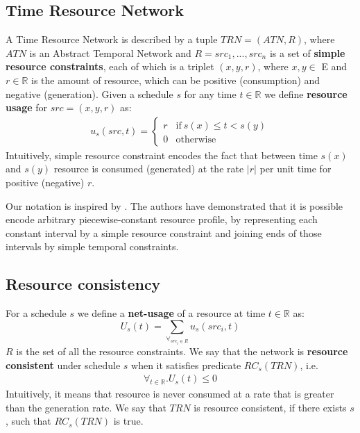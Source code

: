 \subsection{Time Resource Network}
\label{sec:trn_definition}
A Time Resource Network is described by a tuple $TRN = (ATN, R)$, where $ATN$ is an Abstract Temporal Network and $R={src_1, ..., src_n}$ is a set of \textbf{simple resource constraints}, each of which is a triplet $(x, y, r)$, where $x, y \in$ E and $r \in \mathbb{R}$ is the amount of resource, which can be positive (consumption) and negative (generation). Given a schedule $s$ for any time $t \in \mathbb{R}$ we define \textbf{resource usage} for $src=(x,y,r)$ as:
\begin{align*}
u_s(src, t) = \begin{cases}
r & \text{if}\ s(x) \leq t < s(y)\\
0 & \text{otherwise}
\end{cases}
\end{align*}
Intuitively, simple resource constraint encodes the fact that between time $s(x)$ and $s(y)$  resource is consumed (generated) at the rate $|r|$ per unit time for positive (negative) $r$.

Our notation is inspired by \cite{bartusch1988scheduling}. The authors have demonstrated that it is possible encode arbitrary piecewise-constant resource profile, by representing each constant interval by a simple resource constraint and joining ends of those intervals by simple temporal constraints.


\subsection{Resource consistency}
For a schedule $s$ we define a \textbf{net-usage} of a resource at time $t \in \mathbb{R}$ as:
\[
U_s(t) = \sum_{\forall_{src_i \in R}} u_s(src_i, t)
\]
$R$ is the set of all the resource constraints. We say that the network is \textbf{resource consistent} under schedule $s$ when it satisfies predicate $RC_s(TRN)$, i.e.
\begin{align}
\label{usage_for_all}\forall_{t \in \mathbb{R}} . U_s(t) \leq 0
\end{align}
Intuitively, it means that resource is never consumed at a rate that is greater than the generation rate. We say that $TRN$ is resource consistent, if there exists $s$, such that $RC_s(TRN)$ is true.


